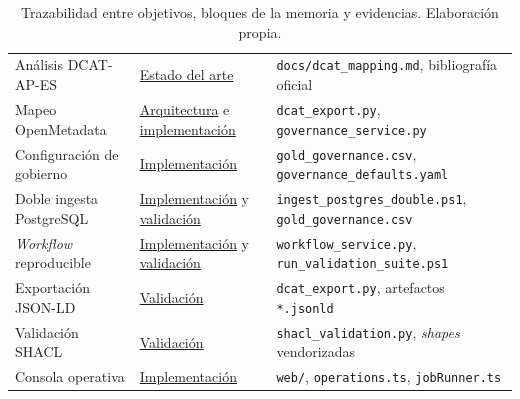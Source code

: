 \begin{table}[ht]
\footnotesize
\centering
\begin{tabular}{|L{3.6cm}|L{4.6cm}|L{5.2cm}|}
\hline
{}
 &  &  \\ \hline
Análisis DCAT-AP-ES & \hyperref[cap:estado-arte]{Estado del arte} & \texttt{docs/dcat\_mapping.md}, bibliografía oficial \\ \hline
Mapeo OpenMetadata & \hyperref[cap:arquitectura]{Arquitectura} e \hyperref[cap:implementacion]{implementación} & \texttt{dcat\_export.py}, \texttt{governance\_service.py} \\ \hline
Configuración de gobierno & \hyperref[cap:implementacion]{Implementación} & \texttt{gold\_governance.csv}, \texttt{governance\_defaults.yaml} \\ \hline
Doble ingesta PostgreSQL & \hyperref[cap:implementacion]{Implementación} y \hyperref[cap:validacion]{validación} & \texttt{ingest\_postgres\_double.ps1}, \texttt{gold\_governance.csv} \\ \hline
\emph{Workflow} reproducible & \hyperref[cap:implementacion]{Implementación} y \hyperref[cap:validacion]{validación} & \texttt{workflow\_service.py}, \texttt{run\_validation\_suite.ps1} \\ \hline
Exportación JSON-LD & \hyperref[cap:validacion]{Validación} & \texttt{dcat\_export.py}, artefactos \texttt{*.jsonld} \\ \hline
Validación SHACL & \hyperref[cap:validacion]{Validación} & \texttt{shacl\_validation.py}, \emph{shapes} vendorizadas \\ \hline
Consola operativa & \hyperref[cap:implementacion]{Implementación} & \texttt{web/}, \texttt{operations.ts}, \texttt{jobRunner.ts} \\ \hline
\end{tabular}
\caption{Trazabilidad entre objetivos, bloques de la memoria y evidencias. Elaboración propia.}
\label{tab:trazabilidad}
\end{table}
